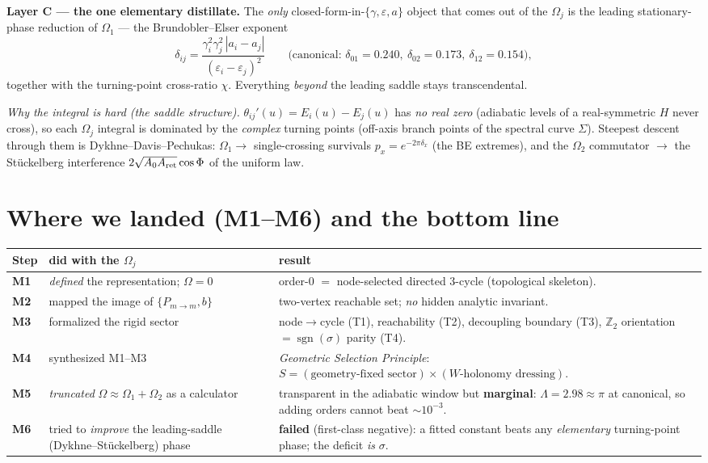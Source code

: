 \documentclass[11pt]{article}
\newcommand{\eps}{\varepsilon}
\newcommand{\Pmid}{P_{m\to m}}
\begin{document}
\textbf{Layer C --- the one elementary distillate.}
The \emph{only} closed-form-in-$\{\gamma,\eps,a\}$ object that comes out of the $\Omega_j$ is the leading
stationary-phase reduction of $\Omega_1$ --- the Brundobler--Elser exponent
\[
\delta_{ij}=\frac{\gamma_i^2\gamma_j^2\,|a_i-a_j|}{(\eps_i-\eps_j)^2}
\qquad\big(\text{canonical: }\delta_{01}=0.240,\ \delta_{02}=0.173,\ \delta_{12}=0.154\big),
\]
together with the turning-point cross-ratio $\chi$. Everything \emph{beyond} the leading saddle stays
transcendental.

\medskip
\noindent\emph{Why the integral is hard (the saddle structure).} $\theta_{ij}'(u)=E_i(u)-E_j(u)$ has
\emph{no real zero} (adiabatic levels of a real-symmetric $H$ never cross), so each $\Omega_j$ integral is
dominated by the \emph{complex} turning points (off-axis branch points of the spectral curve $\Sigma$).
Steepest descent through them is Dykhne--Davis--Pechukas: $\Omega_1\!\to$ single-crossing survivals
$p_x=e^{-2\pi\delta_x}$ (the BE extremes), and the $\Omega_2$ commutator $\to$ the St\"uckelberg interference
$2\sqrt{A_0A_{\rm ret}}\cos\Phi$ of the uniform law.

\section{Where we landed (M1--M6) and the bottom line}

\begin{center}
\small
\begin{tabular}{@{}llp{8.0cm}@{}}
\toprule
Step & did with the $\Omega_j$ & result \\
\midrule
\textbf{M1} & \emph{defined} the representation; $\Omega{=}0$ & order-$0$ $=$ node-selected directed $3$-cycle (topological skeleton). \\
\textbf{M2} & mapped the image of $\{\Pmid,b\}$ & two-vertex reachable set; \emph{no} hidden analytic invariant. \\
\textbf{M3} & formalized the rigid sector & node$\to$cycle (T1), reachability (T2), decoupling boundary (T3), $\mathbb Z_2$ orientation $=\operatorname{sgn}(\sigma)$ parity (T4). \\
\textbf{M4} & synthesized M1--M3 & \emph{Geometric Selection Principle}: $S=(\text{geometry-fixed sector})\times(\text{$W$-holonomy dressing})$. \\
\textbf{M5} & \emph{truncated} $\Omega\!\approx\!\Omega_1{+}\Omega_2$ as a calculator & transparent in the adiabatic window but \textbf{marginal}: $\Lambda{=}2.98{\approx}\pi$ at canonical, so adding orders cannot beat ${\sim}10^{-3}$. \\
\textbf{M6} & tried to \emph{improve} the leading-saddle (Dykhne--St\"uckelberg) phase & \textbf{failed} (first-class negative): a fitted constant beats any \emph{elementary} turning-point phase; the deficit \emph{is} $\sigma$. \\
\bottomrule
\end{tabular}
\end{center}
\end{document}
